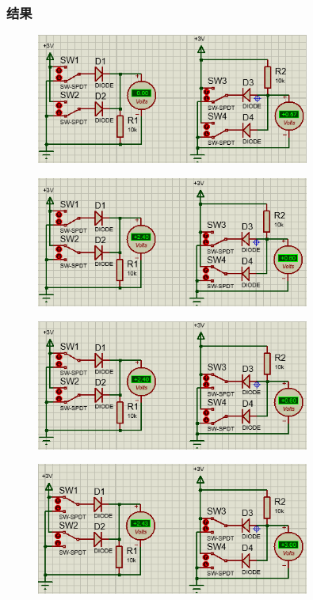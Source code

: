 \documentclass[UTF8, a4paper, 11pt]{article}
\begin{document}
\subsubsection{结果}
\begin{figure}[H]
    \centering
    \includegraphics[width=0.8\textwidth]{00.png}
\end{figure}
\begin{figure}[H]
    \centering
    \includegraphics[width=0.8\textwidth]{01.png}
\end{figure}
\begin{figure}[H]
    \centering
    \includegraphics[width=0.8\textwidth]{10.png}
\end{figure}
\begin{figure}[H]
    \centering
    \includegraphics[width=0.8\textwidth]{11.png}
\end{figure}
\end{document}
